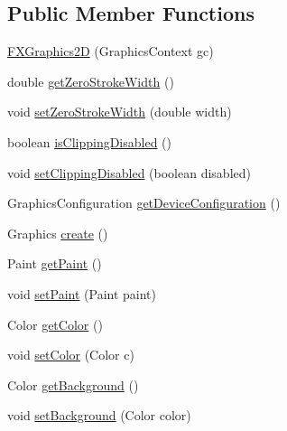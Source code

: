 \subsection*{Public Member Functions}
\begin{DoxyCompactItemize}
\item 
\mbox{\hyperlink{classorg_1_1jfree_1_1chart_1_1fx_1_1_f_x_graphics2_d_a4071640e7c7cbb7488893f8734b636c1}{F\+X\+Graphics2D}} (Graphics\+Context gc)
\item 
double \mbox{\hyperlink{classorg_1_1jfree_1_1chart_1_1fx_1_1_f_x_graphics2_d_acdb61714e29614a33ff3a4900714eb3f}{get\+Zero\+Stroke\+Width}} ()
\item 
void \mbox{\hyperlink{classorg_1_1jfree_1_1chart_1_1fx_1_1_f_x_graphics2_d_a485af8716e9c56d306cffc7e5aaa05f8}{set\+Zero\+Stroke\+Width}} (double width)
\item 
boolean \mbox{\hyperlink{classorg_1_1jfree_1_1chart_1_1fx_1_1_f_x_graphics2_d_a833596d292d4bfdff89d0c4942d3d115}{is\+Clipping\+Disabled}} ()
\item 
void \mbox{\hyperlink{classorg_1_1jfree_1_1chart_1_1fx_1_1_f_x_graphics2_d_aecf5a0b447282a022272883caf11bd4c}{set\+Clipping\+Disabled}} (boolean disabled)
\item 
Graphics\+Configuration \mbox{\hyperlink{classorg_1_1jfree_1_1chart_1_1fx_1_1_f_x_graphics2_d_a086eed2be1115ccaca80e0797d381a5d}{get\+Device\+Configuration}} ()
\item 
Graphics \mbox{\hyperlink{classorg_1_1jfree_1_1chart_1_1fx_1_1_f_x_graphics2_d_a7d14c1c6d9702c08210f42bc718cf1ec}{create}} ()
\item 
Paint \mbox{\hyperlink{classorg_1_1jfree_1_1chart_1_1fx_1_1_f_x_graphics2_d_a67325fdaf847a6daf0d98da1771f5638}{get\+Paint}} ()
\item 
void \mbox{\hyperlink{classorg_1_1jfree_1_1chart_1_1fx_1_1_f_x_graphics2_d_adad6db25635ffeb6e5684c12d2ca03aa}{set\+Paint}} (Paint paint)
\item 
Color \mbox{\hyperlink{classorg_1_1jfree_1_1chart_1_1fx_1_1_f_x_graphics2_d_a5c607df80f641c535f4967ab2bb58d8f}{get\+Color}} ()
\item 
void \mbox{\hyperlink{classorg_1_1jfree_1_1chart_1_1fx_1_1_f_x_graphics2_d_ae27bc5d85d2722a3cb7c3aee37709d34}{set\+Color}} (Color c)
\item 
Color \mbox{\hyperlink{classorg_1_1jfree_1_1chart_1_1fx_1_1_f_x_graphics2_d_ad69034ac41815b09a4db1daae2877142}{get\+Background}} ()
\item 
void \mbox{\hyperlink{classorg_1_1jfree_1_1chart_1_1fx_1_1_f_x_graphics2_d_a51d0f635dc7888223c326861aa4849f2}{set\+Background}} (Color color)

\end{DoxyCompactItemize}
